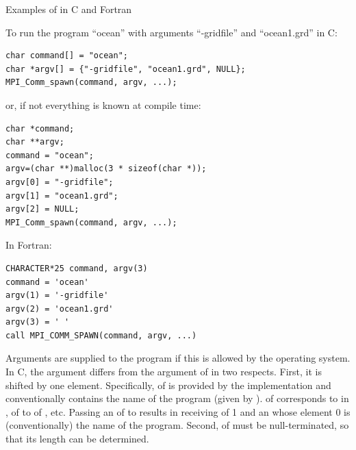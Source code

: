 \begin{description}
\begin{example}
Examples of  in C and Fortran
%

\noindent To run the program ``ocean'' with arguments ``-gridfile'' and
``ocean1.grd'' in C:
\begin{lstlisting}[language={[MPI]C}]
char command[] = "ocean";
char *argv[] = {"-gridfile", "ocean1.grd", NULL};
MPI_Comm_spawn(command, argv, ...);
\end{lstlisting}
or, if not everything is known at compile time:
\begin{lstlisting}[language={[MPI]C}]
char *command;
char **argv;
command = "ocean";
argv=(char **)malloc(3 * sizeof(char *));
argv[0] = "-gridfile";
argv[1] = "ocean1.grd";
argv[2] = NULL;
MPI_Comm_spawn(command, argv, ...);
\end{lstlisting}
In Fortran:
\begin{lstlisting}[language={[MPI]Fortran}]
CHARACTER*25 command, argv(3)
command = 'ocean'
argv(1) = '-gridfile'
argv(2) = 'ocean1.grd'
argv(3) = ' '
call MPI_COMM_SPAWN(command, argv, ...)
\end{lstlisting}
\end{example}

Arguments are supplied to the program if this is allowed by the
operating system. In C, the  argument
 differs from the 
argument of  in two respects. First, it is shifted by one element.
Specifically,  of  is provided
by the implementation and conventionally contains
the name of the program (given by ). 
of  corresponds to  in
,  of  to
 of , etc.
Passing an  of
 to 
results in  receiving  of 1
and an  whose element 0 is (conventionally) the
name of the program.
Second,  of  must be null-terminated, so that its length can be determined.


\end{description}
